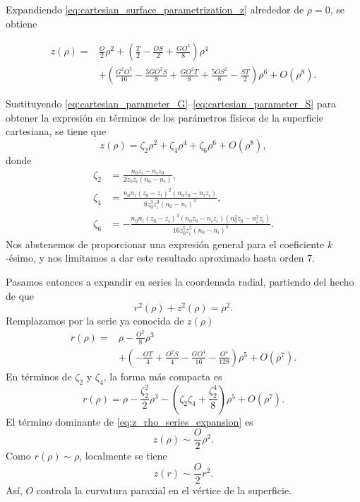 Expandiendo \eqref{eq:cartesian_surface_parametrization_z} alrededor de \(\rho=0\), se obtiene

\begin{align}
z(\rho)
=
{}&
\frac{O}{2}\rho^2
+
\left(
\frac{T}{2}
-
\frac{OS}{2}
+
\frac{GO^3}{8}
\right)\rho^4
\nonumber
\\[6pt]
&
+
\left(
\frac{G^2O^5}{16}
-
\frac{3GO^3S}{8}
+
\frac{GO^2T}{8}
+
\frac{5OS^2}{8}
-
\frac{ST}{2}
\right)\rho^6
+
O(\rho^8).
\label{eq:z_rho_series_expansion}
\end{align}

Sustituyendo \eqref{eq:cartesian_parameter_G}--\eqref{eq:cartesian_parameter_S} para obtener la expresión en términos de los parámetros físicos de la superficie cartesiana, se tiene que
\begin{equation}
z(\rho)
=
\zeta_2\rho^2
+
\zeta_4\rho^4
+
\zeta_6\rho^6
+
O(\rho^8),
\label{eq:z_rho_series_substituted}
\end{equation}
donde
\begin{align}
\zeta_2
&=
\frac{
n_0z_i-n_iz_0
}{
2z_0z_i(n_0-n_i)
},
\label{eq:zeta_2_definition}
\\[6pt]
\zeta_4
&=
\frac{
n_0n_i(z_0-z_i)^2(n_0z_0-n_iz_i)
}{
8z_0^3z_i^3(n_0-n_i)^3
},
\label{eq:zeta_4_definition}
\\[6pt]
\zeta_6
&=
-
\frac{
n_0n_i(z_0-z_i)^3
(n_0z_0-n_iz_i)
(n_0^2z_0-n_i^2z_i)
}{
16z_0^5z_i^5(n_0-n_i)^5
}.
\label{eq:zeta_6_definition}
\end{align}
Nos abstenemos de proporcionar una expresión general para el coeficiente $k$-ésimo,
y nos limitamos a dar este resultado aproximado hasta orden 7.

Pasamos entonces a expandir en series la coordenada radial, partiendo del hecho de que
\begin{equation}
r^2(\rho)+z^2(\rho)=\rho^2.
\label{eq:identity_r2_z2_rho2}
\end{equation}
Remplazamos por la serie ya conocida de $z(\rho)$
\begin{align}
r(\rho)
=
{}&
\rho
-
\frac{O^2}{8}\rho^3
\nonumber
\\[6pt]
&
+
\left(
-\frac{OT}{4}
+
\frac{O^2S}{4}
-
\frac{GO^4}{16}
-
\frac{O^4}{128}
\right)\rho^5
+
O(\rho^7).
\label{eq:r_rho_series_expansion}
\end{align}
En términos de \(\zeta_2\) y \(\zeta_4\), la forma más compacta es
\begin{equation}
r(\rho)
=
\rho
-
\frac{\zeta_2^2}{2}\rho^3
-
\left(
\zeta_2\zeta_4
+
\frac{\zeta_2^4}{8}
\right)\rho^5
+
O(\rho^7).
\label{eq:r_rho_series_zeta_form}
\end{equation}
El término dominante de \eqref{eq:z_rho_series_expansion} es
\begin{equation}
z(\rho)
\sim
\frac{O}{2}\rho^2.
\label{eq:vertex_paraxial_curvature}
\end{equation}
Como \(r(\rho)\sim\rho\), localmente se tiene
\begin{equation}
z(r)
\sim
\frac{O}{2}r^2.
\label{eq:vertex_curvature_sag_form}
\end{equation}
Así, \(O\) controla la curvatura paraxial en el vértice de la superficie.

